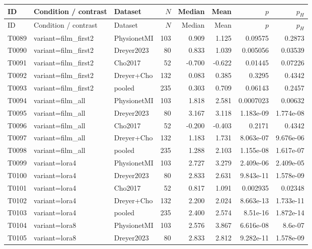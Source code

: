 \begin{longtable}{p{.45in}p{2.6in}p{.75in}rrrrr}
\toprule
ID & Condition / contrast & Dataset & $N$ & Median & Mean & $p$ & $p_H$ \\
\midrule
\endfirsthead
\toprule
ID & Condition / contrast & Dataset & $N$ & Median & Mean & $p$ & $p_H$ \\
\midrule
\endhead
T0089 & variant=film\_\allowbreak{}first2 & PhysionetMI & 103 & 0.909 & 1.125 & 0.09575 & 0.2873 \\
T0090 & variant=film\_\allowbreak{}first2 & Dreyer2023 & 80 & 0.833 & 1.039 & 0.005056 & 0.03539 \\
T0091 & variant=film\_\allowbreak{}first2 & Cho2017 & 52 & -0.700 & -0.622 & 0.01445 & 0.07226 \\
T0092 & variant=film\_\allowbreak{}first2 & Dreyer+Cho & 132 & 0.083 & 0.385 & 0.3295 & 0.4342 \\
T0093 & variant=film\_\allowbreak{}first2 & pooled & 235 & 0.303 & 0.709 & 0.06143 & 0.2457 \\
T0094 & variant=film\_\allowbreak{}all & PhysionetMI & 103 & 1.818 & 2.581 & 0.0007023 & 0.00632 \\
T0095 & variant=film\_\allowbreak{}all & Dreyer2023 & 80 & 3.167 & 3.118 & 1.183e-09 & 1.774e-08 \\
T0096 & variant=film\_\allowbreak{}all & Cho2017 & 52 & -0.200 & -0.403 & 0.2171 & 0.4342 \\
T0097 & variant=film\_\allowbreak{}all & Dreyer+Cho & 132 & 1.183 & 1.731 & 8.063e-07 & 9.676e-06 \\
T0098 & variant=film\_\allowbreak{}all & pooled & 235 & 1.288 & 2.103 & 1.155e-08 & 1.617e-07 \\
T0099 & variant=lora4 & PhysionetMI & 103 & 2.727 & 3.279 & 2.409e-06 & 2.409e-05 \\
T0100 & variant=lora4 & Dreyer2023 & 80 & 2.833 & 2.631 & 9.843e-11 & 1.578e-09 \\
T0101 & variant=lora4 & Cho2017 & 52 & 0.817 & 1.091 & 0.002935 & 0.02348 \\
T0102 & variant=lora4 & Dreyer+Cho & 132 & 2.200 & 2.024 & 8.663e-13 & 1.733e-11 \\
T0103 & variant=lora4 & pooled & 235 & 2.400 & 2.574 & 8.51e-16 & 1.872e-14 \\
T0104 & variant=lora8 & PhysionetMI & 103 & 2.576 & 3.867 & 6.616e-08 & 8.6e-07 \\
T0105 & variant=lora8 & Dreyer2023 & 80 & 2.833 & 2.812 & 9.282e-11 & 1.578e-09 \\

\end{longtable}
